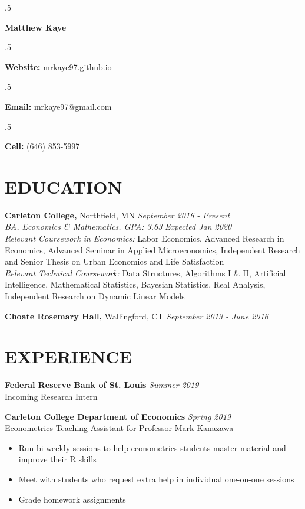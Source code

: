 \documentclass[margin, 10pt]{res} %
\begin{document}
\singlespacing

\moveleft.5\hoffset\centerline{\LARGE\bf Matthew Kaye} %
\medskip
\moveleft.5\hoffset\centerline{\textbf{Website:} mrkaye97.github.io}
\moveleft.5\hoffset\centerline{\textbf{Email:} mrkaye97@gmail.com}
\moveleft.5\hoffset\centerline{\textbf{Cell:} (646) 853-5997}


\begin{resume}


\section{EDUCATION}

{\sl} \textbf{Carleton College,} Northfield, MN \hfill \textit{September 2016 - Present}\smallskip\\
{\sl BA, Economics \& Mathematics. GPA: 3.63} \hfill \textit{Expected Jan 2020}\smallskip\\
{\sl Relevant Coursework in Economics: } Labor Economics, Advanced Research in Economics, Advanced Seminar in Applied Microeconomics, Independent Research and Senior Thesis on Urban Economics and Life Satisfaction\smallskip\\
{\sl Relevant Technical Coursework: } Data Structures, Algorithms I \& II, Artificial Intelligence, Mathematical Statistics, Bayesian Statistics, Real Analysis, Independent Research on Dynamic Linear Models

{\sl} \textbf{Choate Rosemary Hall,} Wallingford, CT \hfill \textit{September 2013 - June 2016}

\section{EXPERIENCE}
{\sl} \textbf{Federal Reserve Bank of St. Louis} \hfill \textit{Summer 2019}\smallskip\\
{\sl} Incoming Research Intern \smallskip

{\sl} \textbf{Carleton College Department of Economics} \hfill \textit{Spring 2019}\\
{\sl} Econometrics Teaching Assistant for Professor Mark Kanazawa\smallskip
{\sl} \begin{itemize}
	\item Run bi-weekly sessions to help econometrics students master material and improve their R skills
	\item Meet with students who request extra help in individual one-on-one sessions
	\item Grade homework assignments
\end{itemize}



\end{resume}
\end{document}
